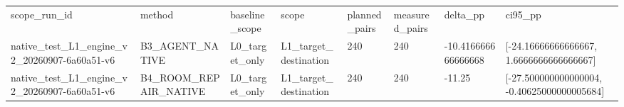 \begin{tabular}{llllllll}
scope\_run\_id & method & baseline\_scope & scope & planned\_pairs & measured\_pairs & delta\_pp & ci95\_pp \\
native\_test\_L1\_engine\_v2\_20260907-6a60a51-v6 & B3\_AGENT\_NATIVE & L0\_target\_only & L1\_target\_destination & 240 & 240 & -10.416666666666668 & [-24.16666666666667, 1.6666666666666667] \\
native\_test\_L1\_engine\_v2\_20260907-6a60a51-v6 & B4\_ROOM\_REPAIR\_NATIVE & L0\_target\_only & L1\_target\_destination & 240 & 240 & -11.25 & [-27.500000000000004, -0.40625000000005684] \\
\end{tabular}
